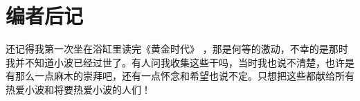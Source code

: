 \chapter{编者后记}

还记得我第一次坐在浴缸里读完《黄金时代》 ，那是何等的激动，不幸的是那时我并不知道小波已经过世了。有人问我收集这些干吗，当时我也说不清楚，也许是
有那么一点麻木的崇拜吧，还有一点怀念和希望也说不定。只想把这些都献给所有热爱小波和将要热爱小波的人们！


